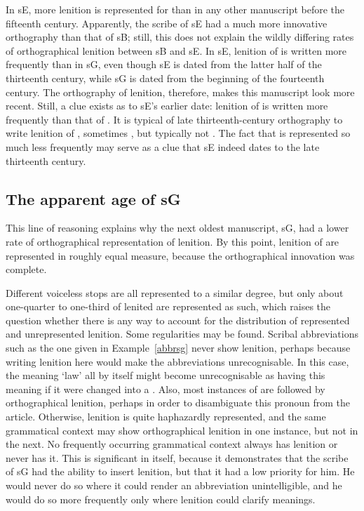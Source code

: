 In \gls{sE},  more lenition is represented for  than in any other manuscript before the fifteenth century. Apparently, the scribe of \gls{sE} had a much more innovative orthography than that of \gls{sB}; still, this does not explain the wildly differing rates of orthographical lenition between \gls{sB} and \gls{sE}. In \gls{sE}, lenition of  is written more frequently than in \gls{sG}, even though \gls{sE} is dated from the latter half of the thirteenth century, while \gls{sG} is dated from the beginning of the fourteenth century. The orthography of lenition, therefore, makes this manuscript look more recent. Still, a clue exists as to \gls{sE}'s earlier date: lenition of  is written  more frequently than that of . It is typical of late thirteenth-century orthography to write lenition of , sometimes , but typically not . The fact that  is represented so much less frequently may serve as a clue that \gls{sE} indeed dates to the late thirteenth century.

\subsection{The apparent age of \gls{sG}}
\label{sec:apparent-age-glssg}

This line of reasoning explains why the next oldest manuscript, \gls{sG}, had a lower rate of orthographical representation of lenition. By this point, lenition of  are represented in roughly equal measure, because the orthographical innovation was complete. 

Different voiceless stops are all represented to a similar degree, but only about one-quarter to one-third of lenited  are represented as such, which raises the question whether there is any way to account for the distribution of represented and unrepresented lenition. Some regularities may be found. Scribal abbreviations such as the one given in Example~\ref{abbrsg} never show lenition, perhaps because writing lenition here would make the abbreviations unrecognisable.
In this case, the  meaning `law' all by itself might become unrecognisable as having this meaning if it were changed into a . Also, most instances of  are followed by orthographical lenition, perhaps in order to disambiguate this pronoun from the article.
Otherwise, lenition is quite haphazardly represented, and the same grammatical context may show orthographical lenition in one instance, but not in the next. No frequently occurring grammatical context always has lenition or never has it. This is significant in itself, because it demonstrates that the scribe of \gls{sG} had the ability to insert lenition, but that it had a low priority for him. He would never do so where it could render an abbreviation unintelligible, and he would do so more frequently only where lenition could clarify meanings.

